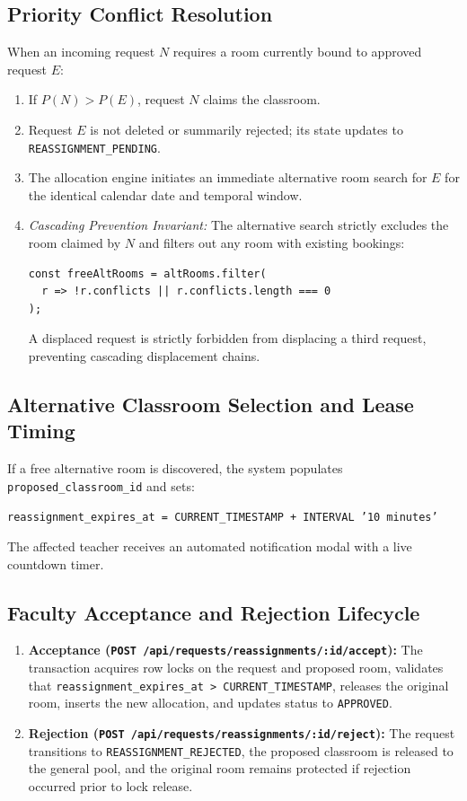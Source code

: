 \documentclass[conference]{IEEEtran}
\begin{document}
\subsection{Priority Conflict Resolution}
When an incoming request $N$ requires a room currently bound to approved request $E$:
\begin{enumerate}
    \item If $P(N) > P(E)$, request $N$ claims the classroom.
    \item Request $E$ is not deleted or summarily rejected; its state updates to \texttt{REASSIGNMENT\_PENDING}.
    \item The allocation engine initiates an immediate alternative room search for $E$ for the identical calendar date and temporal window.
    \item \textit{Cascading Prevention Invariant:} The alternative search strictly excludes the room claimed by $N$ and filters out any room with existing bookings:
\begin{verbatim}
const freeAltRooms = altRooms.filter(
  r => !r.conflicts || r.conflicts.length === 0
);
\end{verbatim}
    A displaced request is strictly forbidden from displacing a third request, preventing cascading displacement chains.
\end{enumerate}

\subsection{Alternative Classroom Selection and Lease Timing}
If a free alternative room is discovered, the system populates \texttt{proposed\_classroom\_id} and sets:
\begin{center}
\small
\texttt{reassignment\_expires\_at = CURRENT\_TIMESTAMP + INTERVAL '10 minutes'}
\end{center}
The affected teacher receives an automated notification modal with a live countdown timer.

\subsection{Faculty Acceptance and Rejection Lifecycle}
\begin{enumerate}
    \item \textbf{Acceptance (\texttt{POST /api/requests/reassignments/:id/accept}):} The transaction acquires row locks on the request and proposed room, validates that \texttt{reassignment\_expires\_at > CURRENT\_TIMESTAMP}, releases the original room, inserts the new allocation, and updates status to \texttt{APPROVED}.
    \item \textbf{Rejection (\texttt{POST /api/requests/reassignments/:id/reject}):} The request transitions to \texttt{REASSIGNMENT\_REJECTED}, the proposed classroom is released to the general pool, and the original room remains protected if rejection occurred prior to lock release.
\end{enumerate}
\end{document}
